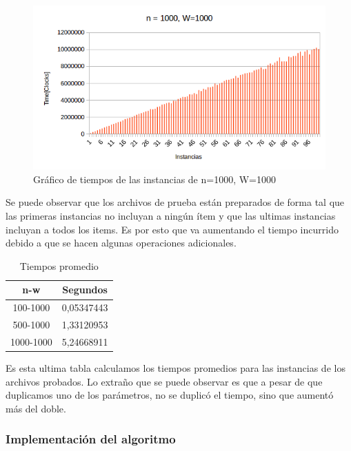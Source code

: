 \begin{figure}[H]
\centering
\includegraphics[width=\textwidth]{Mochila/1000_1000.png}
\caption{Gráfico de tiempos de las instancias de n=1000, W=1000}
\end{figure}

Se puede observar que los archivos de prueba están preparados de forma tal que las primeras instancias no incluyan a ningún ítem y que las ultimas instancias incluyan a todos los items. Es por esto que 
va aumentando el tiempo incurrido debido a que se hacen algunas operaciones adicionales.

\begin{table}[H]
\centering
\begin{tabular}{|c|c|}
\hline
\textbf{n-w} & \textbf{Segundos} \\ \hline
100-1000     & 0,05347443        \\ \hline
500-1000     & 1,33120953        \\ \hline
1000-1000    & 5,24668911        \\ \hline
\end{tabular}
\caption{Tiempos promedio}
\end{table}

Es esta ultima tabla calculamos los tiempos promedios para las instancias de los archivos probados.
Lo extraño que se puede observar es que a pesar de que duplicamos uno de los parámetros, no se duplicó el tiempo, sino que aumentó más del doble.

\newpage

\subsubsection{Implementación del algoritmo}







